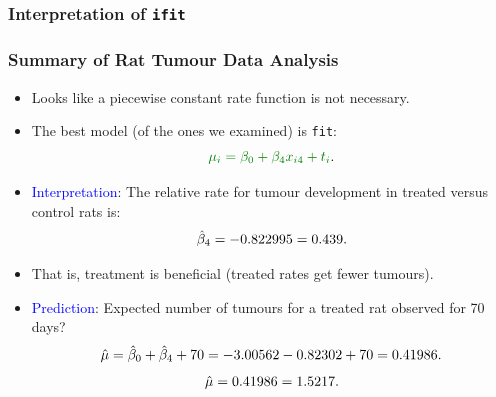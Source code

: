 \documentclass[oneside]{book}\usepackage[]{graphicx}\usepackage[svgnames]{xcolor}
\makeatletter
\newcommand{\hlnum}[1]{\textcolor[rgb]{0.686,0.059,0.569}{#1}}%
\newcommand{\hlopt}[1]{\textcolor[rgb]{0,0,0}{#1}}%
\newcommand{\hlstd}[1]{\textcolor[rgb]{0.345,0.345,0.345}{#1}}%
\newcommand{\hlkwd}[1]{\textcolor[rgb]{0.737,0.353,0.396}{\textbf{#1}}}%
\newenvironment{kframe}{%
 \def\at@end@of@kframe{}%
 \ifinner\ifhmode%
  \def\at@end@of@kframe{\end{minipage}}%
  \begin{minipage}{\columnwidth}%
 \fi\fi%
 \def\FrameCommand##1{\hskip\@totalleftmargin \hskip-\fboxsep
 \colorbox{shadecolor}{##1}\hskip-\fboxsep
     \hskip-\linewidth \hskip-\@totalleftmargin \hskip\columnwidth}%
 \MakeFramed {\advance\hsize-\width
   \@totalleftmargin\z@ \linewidth\hsize
   \@setminipage}}%
 {\par\unskip\endMakeFramed%
 \at@end@of@kframe}
\newenvironment{knitrout}{}{} %
\let\exp\relax%
\let\log\relax%
\newcommand{\HN}{\textsl{H}_{\textsl{0}}}%
\makeatother
\begin{document}
\subsubsection*{Interpretation of \texttt{ifit}}
\subsubsection*{Summary of Rat Tumour Data Analysis}
\begin{itemize}
      \item Looks like a piecewise constant rate function is not necessary.
      \item The best model (of the ones we examined) is \texttt{fit}:
            \[ \textcolor{Green}{\log{\mu_i}=\beta_0+\beta_4x_{i4}+\log{t_i}}. \]
      \item \textcolor{Blue}{Interpretation}: The relative rate for tumour development in treated versus control
            rats is:
            \[ \exp{\hat{\beta}_4}=\exp{-0.822995}=0.439. \]
      \item That is, treatment is beneficial (treated rates get fewer tumours).
      \item \textcolor{Blue}{Prediction}: Expected number of tumours for a treated rat observed for 70 days?
            \[ \log{\hat{\mu}}=\hat{\beta}_0+\hat{\beta}_4+\log{70}=-3.00562-0.82302+\log{70}=0.41986. \]
            \[ \hat{\mu}=\exp{0.41986}=1.5217. \]
\end{itemize}
\end{document}
